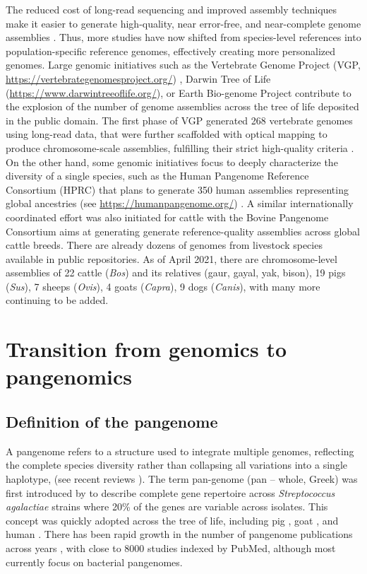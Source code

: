 \documentclass[../main.tex]{subfiles}
\begin{document}
The reduced cost of long-read sequencing and improved assembly techniques  make it easier to generate high-quality, near error-free, and near-complete genome assemblies \citep{miga2020telomere,logsdon2021structure}. Thus, more studies have now shifted from species-level references into population-specific reference genomes, effectively creating more personalized genomes. Large genomic initiatives such as the Vertebrate Genome Project (VGP, \url{https://vertebrategenomesproject.org/}) \citep{Rhie2021}, Darwin Tree of Life (\url{https://www.darwintreeoflife.org/}), or Earth Bio-genome Project \citep{lewin2018earth} contribute to the explosion of the number of genome assemblies across the tree of life deposited in the public domain. The first phase of VGP generated 268 vertebrate genomes using long-read data, that were further scaffolded with optical mapping to produce chromosome-scale assemblies, fulfilling their strict high-quality criteria \citep{Rhie2021}. On the other hand, some genomic initiatives focus to deeply characterize the diversity of a single species, such as the Human Pangenome Reference Consortium (HPRC) that plans to generate 350 human assemblies representing global ancestries (see \url{https://humanpangenome.org/}) \citep{miga2021need}. A similar internationally coordinated effort was also initiated for cattle with the Bovine Pangenome Consortium \citep{heaton2021reference} aims at generating generate reference-quality assemblies across global cattle breeds. There are already dozens of genomes from livestock species available in public repositories. As of April 2021, there are chromosome-level assemblies of 22 cattle (\emph{Bos}) and its relatives (gaur, gayal, yak, bison), 19 pigs (\emph{Sus}), 7 sheeps (\emph{Ovis}), 4 goats (\emph{Capra}), 9 dogs (\emph{Canis}), with many more continuing to be added.

\section{Transition from genomics to pangenomics}

\subsection*{Definition of the pangenome}

A pangenome refers to a structure used to  integrate multiple genomes, reflecting the complete species diversity rather than collapsing all variations into a single haplotype, (see recent reviews \citep{bayer2020plant,sherman2020pan,della2021pan}). The term pan-genome (pan – whole, Greek) was first introduced by \citet{tettelin2005genome} to describe complete gene repertoire across \emph{Streptococcus agalactiae} strains where 20\% of the genes are variable across isolates. This concept was quickly adopted across the tree of life, including pig \citep{li2017comprehensive,tian2019building}, goat \citep{li2019towards}, and human \citep{duan2019hupan,sherman2019assembly}. There has been rapid growth in the number of pangenome publications across years \citep{bayer2020plant}, with close to 8000 studies indexed by PubMed,  although most currently focus on bacterial pangenomes.  
\end{document}

